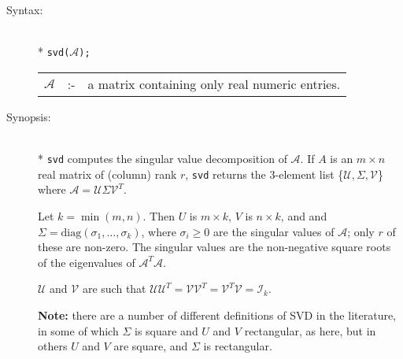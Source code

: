 \begin{description}
\item[Syntax:]\mbox{}\\*
\texttt{svd($\mathcal{A}$);}\\[2mm]
\begin{tabular}{l l l} 
$\mathcal{A}$ &:-& a matrix containing only real numeric entries.
\end{tabular}

\item[Synopsis:]\mbox{}\\*
\texttt{svd} computes the singular value decomposition of $\mathcal{A}$. 
If $A$
is an $m\times n$ real matrix of (column) rank $r$, \texttt{svd} returns the
3-element list \{$\mathcal{U},\Sigma,\mathcal{V}$\} where $\mathcal{A} =
\mathcal{U} \Sigma \mathcal{V}^T$. 

Let $k=\min(m,n)$.  Then $U$ is $m\times k$,
$V$ is $n\times k$, and and $\Sigma = \mbox{diag}(\sigma_{1}, \ldots ,\sigma_{k})$,
where $\sigma_{i}\ge 0$ are the singular values of $\mathcal{A}$; only $r$ of
these are non-zero.  The singular values are the non-negative square roots of
the eigenvalues of $\mathcal{A}^T \mathcal{A}$. 

$\mathcal{U}$ and $\mathcal{V}$ are such that $\mathcal{UU}^T = \mathcal{VV}^T = 
\mathcal{V}^T \mathcal{V} = \mathcal{I}_k$.

\textbf{Note:} there are a number of different definitions of SVD in the
literature, in some of which $\Sigma$ is square and $U$ and $V$ rectangular, as
here, but in others $U$ and $V$ are square, and $\Sigma$ is rectangular.


\end{description}
